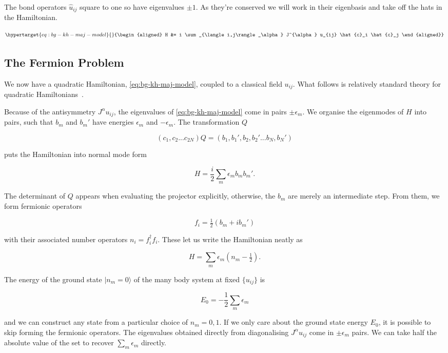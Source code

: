 The bond operators \(\hat{u}_{ij}\) square to one so have eigenvalues \(\pm1\). As they're conserved we will work in their eigenbasis and take off the hats in the Hamiltonian.

\begin{equation}\protect\hypertarget{eq:bg-kh-maj-model}{}{\begin{aligned}
H &=  i \sum_{\langle i,j\rangle_\alpha} J^{\alpha} u_{ij} \hat{c}_i \hat{c}_j
\end{aligned}}\label{eq:bg-kh-maj-model}\end{equation}

\hypertarget{the-fermion-problem}{%
\subsection{The Fermion Problem}\label{the-fermion-problem}}

We now have a quadratic Hamiltonian, \cref{eq:bg-kh-maj-model}, coupled to a classical field \(u_{ij}\). What follows is relatively standard theory for quadratic Hamiltonians~\autocite{BlaizotRipka1986}.

Because of the antisymmetry \(J^{\alpha} u_{ij}\), the eigenvalues of \cref{eq:bg-kh-maj-model} come in pairs \(\pm \epsilon_m\). We organise the eigenmodes of \(H\) into pairs, such that \(b_m\) and \(b_m'\) have energies \(\epsilon_m\) and \(-\epsilon_m\). The transformation \(Q\)

\[(c_1, c_2... c_{2N}) Q = (b_1, b_1', b_2, b_2' ... b_{N}, b_{N}')\]

puts the Hamiltonian into normal mode form

\[H = \frac{i}{2} \sum_m \epsilon_m b_m b_m'.\]

The determinant of \(Q\) appears when evaluating the projector explicitly, otherwise, the \(b_m\) are merely an intermediate step. From them, we form fermionic operators

\[ f_i = \tfrac{1}{2} (b_m + ib_m')\]

with their associated number operators \(n_i = f^\dagger_i f_i\). These let us write the Hamiltonian neatly as

\[ H = \sum_m \epsilon_m (n_m - \tfrac{1}{2}).\]

The energy of the ground state \(|n_m = 0\rangle\) of the many body system at fixed \(\{u_{ij}\}\) is

\[E_{0} = -\frac{1}{2}\sum_m \epsilon_m \]

and we can construct any state from a particular choice of \(n_m = 0,1\). If we only care about the ground state energy \(E_{0}\), it is possible to skip forming the fermionic operators. The eigenvalues obtained directly from diagonalising \(J^{\alpha} u_{ij}\) come in \(\pm \epsilon_m\) pairs. We can take half the absolute value of the set to recover \(\sum_m \epsilon_m\) directly.

